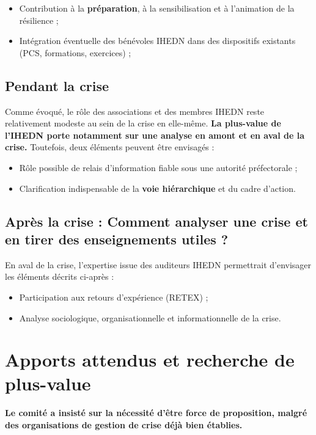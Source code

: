 \documentclass[12pt,a4paper]{article}
\begin{document}
\begin{itemize}
\item Contribution à la \textbf{préparation}, à la sensibilisation et à l'animation de la résilience ;
\item Intégration éventuelle des bénévoles IHEDN dans des dispositifs existants (PCS, formations, exercices) ;
\end{itemize}

\subsection{Pendant la crise}

Comme évoqué, le rôle des associations et des membres IHEDN reste relativement modeste au sein de la crise en elle-même. \textbf{La plus-value de l'IHEDN porte notamment sur une analyse en amont et en aval de la crise.} Toutefois, deux éléments peuvent être envisagés :
\begin{itemize}
\item Rôle possible de relais d'information fiable sous une autorité préfectorale ;
\item  Clarification indispensable de la \textbf{voie hiérarchique} et du cadre d'action.
\end{itemize}

\newpage

\subsection{Après la crise : Comment analyser une crise et en tirer des enseignements utiles ?}

En aval de la crise, l'expertise issue des auditeurs IHEDN permettrait d'envisager les éléments décrits ci-après :
\begin{itemize}
\item Participation aux retours d'expérience (RETEX) ;
\item Analyse sociologique, organisationnelle et informationnelle de la crise.
\end{itemize}


\section{Apports attendus et recherche de plus-value}

\textbf{Le comité a insisté sur la nécessité d'être force de proposition, malgré des organisations de gestion de crise déjà bien établies.}
\end{document}

